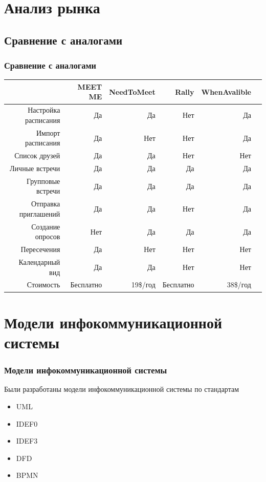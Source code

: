 \documentclass[aspectratio=169]{beamer}
\begin{document}
\section{Анализ рынка}

\subsection{Сравнение с аналогами}
\begin{frame}
    \frametitle{Сравнение с аналогами}
    
    
    \begin{table} 
    \begin{tabular}{r | r r r r r} 
              & MEET ME &  NeedToMeet &  Rally & WhenAvalible \\ \hline
             Настройка расписания    & Да  & Да  & Нет & Да \\
             Импорт расписания       & Да  & Нет & Нет & Да \\
             Список друзей           & Да  & Да  & Нет & Нет \\
             Личные встречи          & Да  & Да  & Да  & Да \\
             Групповые встречи       & Да  & Да  & Да  & Да \\
             Отправка приглашений    & Да  & Да  & Нет & Да \\
             Создание опросов        & Нет & Да  & Да  & Да \\
             Пересечения & Да  & Нет & Нет & Нет \\
             Календарный вид         & Да  & Да  & Нет & Нет \\
             Стоимость               & Бесплатно & 19\$/год & Бесплатно & 38\$/год \\
    \end{tabular} 
    \end{table}
    \end{frame}


\section{Модели инфокоммуникационной системы}
\begin{frame}
    \frametitle{Модели инфокоммуникационной системы}
    Были разработаны модели инфокоммуникационной системы по стандартам 
    \begin{itemize}
        \item UML 
        \item IDEF0 
        \item IDEF3 
        \item DFD
        \item BPMN
    \end{itemize}
\end{frame}
\end{document}
